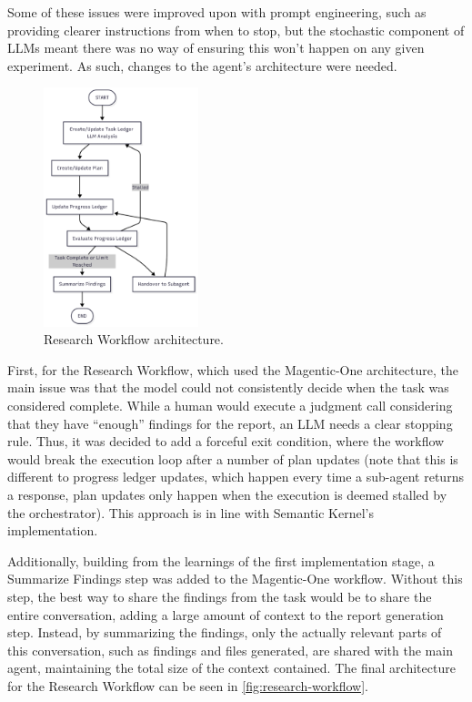 \documentclass[a4paper]{report}
\begin{document}
Some of these issues were improved upon with prompt engineering, such as providing clearer instructions from when to stop, but the stochastic component of LLMs meant there was no way of ensuring this won't happen on any given experiment. As such, changes to the agent's architecture were needed.

\begin{figure}[h]
\centering
\includegraphics[width=0.4\textwidth]{images/research-workflow.png}
\caption{Research Workflow architecture.}
\label{fig:research-workflow}
\end{figure}

First, for the Research Workflow, which used the Magentic-One architecture, the main issue was that the model could not consistently decide when the task was considered complete. While a human would execute a judgment call considering that they have ``enough'' findings for the report, an LLM needs a clear stopping rule. Thus, it was decided to add a forceful exit condition, where the workflow would break the execution loop after a number of plan updates (note that this is different to progress ledger updates, which happen every time a sub-agent returns a response, plan updates only happen when the execution is deemed stalled by the orchestrator). This approach is in line with Semantic Kernel's implementation.

Additionally, building from the learnings of the first implementation stage, a Summarize Findings step was added to the Magentic-One workflow. Without this step, the best way to share the findings from the task would be to share the entire conversation, adding a large amount of context to the report generation step. Instead, by summarizing the findings, only the actually relevant parts of this conversation, such as findings and files generated, are shared with the main agent, maintaining the total size of the context contained. The final architecture for the Research Workflow can be seen in \autoref{fig:research-workflow}.
\end{document}
